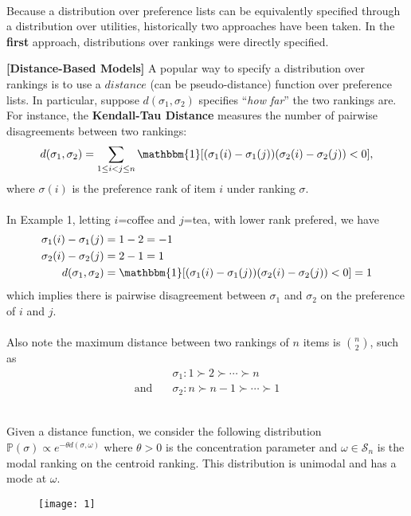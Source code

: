 \documentclass[11pt]{article}
\newcommand{\p}{\mathbb{P}}
\newenvironment{example}[2][Example]{\begin{trivlist}
\item[\hskip \labelsep {\bfseries #1}\hskip \labelsep {\bfseries #2.}]}{\end{trivlist}}
\begin{document}
\quad\\
Because a distribution over preference lists can be equivalently specified through a distribution over utilities, historically two approaches have been taken. In the \textbf{first} approach, distributions over rankings were directly specified.
\begin{tcolorbox}
\begin{example}[Example]
2\textbf{[Distance-Based Models]} A popular way to specify a distribution over rankings is to use a $distance$ (can be pseudo-distance) function over preference lists. In particular, suppose $d(\sigma_1,\sigma_2)$ specifies ``\textit{how far}'' the two rankings are. For instance, the {\bf Kendall-Tau Distance} measures the number of pairwise disagreements between two rankings:
$$d(\sigma_1,\sigma_2)=\sum_{1\leq i<j\leq n}\mathbbm{1}[(\sigma_1(i)-\sigma_1(j))(\sigma_2(i)-\sigma_2(j))<0],$$
where $\sigma(i)$ is the preference rank of item $i$ under ranking $\sigma$.
\\ \\
In Example 1, letting $i$=coffee and $j$=tea, with lower rank prefered, we have
\begin{align*}
\sigma_1(i)-\sigma_1(j)&=1-2=-1\\
\sigma_2(i)-\sigma_2(j)&=2-1=1\\
d(\sigma_1,\sigma_2)&=\mathbbm{1}[(\sigma_1(i)-\sigma_1(j))(\sigma_2(i)-\sigma_2(j))<0]=1
\end{align*}
which implies there is pairwise disagreement between $\sigma_1$ and $\sigma_2$ on the preference of $i$ and $j$.
\\ \\
Also note the maximum distance between two rankings of $n$ items is $\displaystyle\binom{n}{2}$, such as
\begin{align*}
&\sigma_1:1\succ2\succ\cdots\succ n\\
\text{and}\quad&\sigma_2:n\succ n-1\succ\cdots\succ1
\end{align*}
\end{example}
\end{tcolorbox}
\quad\\
Given a distance function, we consider the following distribution $\p(\sigma)\propto e^{-\theta d(\sigma,\omega)}$ where $\theta>0$ is the concentration parameter and $\omega\in\mathscr{S}_n$ is the modal ranking on the centroid ranking. This distribution is unimodal and has a mode at $\omega$.
\begin{figure}[H]
\texttt{[image: 1]}
\centering
\end{figure}
\end{document}
